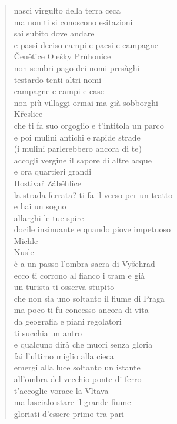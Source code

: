 \clearpage


\begin{verse}
    nasci virgulto della terra ceca\\
    ma non ti si conoscono esitazioni\\
    sai subito dove andare\\
    e passi deciso campi e paesi e campagne\\
    Čenětice Olešky Průhonice\\
    non sembri pago dei nomi presàghi \\
    testardo tenti altri nomi\\
    campagne e campi e case\\
    non più villaggi ormai ma già sobborghi\\
    Křeslice\\
    che ti fa suo orgoglio e t'intitola un parco\\
    e poi mulini antichi e rapide strade\\
    (i mulini parlerebbero ancora di te)\\
    accogli vergine il sapore di altre acque\\
    e ora quartieri grandi\\
    Hostivař Záběhlice\\
    la strada ferrata? ti fa il verso per un tratto\\
    e hai un sogno\\
    allarghi le tue spire\\
    docile insinuante e quando piove impetuoso\\
    Michle\\
    Nusle\\
    è a un passo l'ombra sacra di Vyšehrad\\
    ecco ti corrono al fianco i tram e già\\
    un turista ti osserva stupito\\
    che non sia uno soltanto il fiume di Praga\\
    ma poco ti fu concesso ancora di vita\\
    da geografia e piani regolatori\\
    ti succhia un antro\\
    e qualcuno dirà che muori senza gloria\\
    fai l'ultimo miglio alla cieca\\
    emergi alla luce soltanto un istante\\
    all'ombra del vecchio ponte di ferro\\
    t'accoglie vorace la Vltava\\
    ma lascialo stare il grande fiume \\
    gloriati d'essere primo tra pari
\end{verse}

